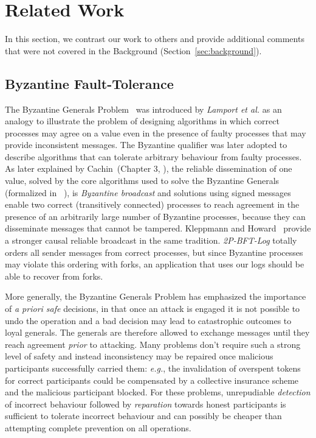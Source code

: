 \documentclass[9pt, oneside]{article}   	%
\begin{document}
\section{Related Work}
\label{sec:rel-work}

In this section, we contrast our work to others and provide additional comments that were not covered in the Background (Section~\ref{sec:background}).

\subsection{Byzantine Fault-Tolerance}

The Byzantine Generals Problem~\cite{lamport2019byzantinegenerals} was introduced by \textit{Lamport et al.} as an analogy to illustrate the problem of designing algorithms in which correct processes may agree on a value even in the presence of faulty processes that may provide inconsistent messages. The Byzantine qualifier was later adopted to describe algorithms that can tolerate arbitrary behaviour from faulty processes. As later explained by Cachin~(Chapter 3, \cite{lamport2019concurrency}), the reliable dissemination of one value, solved by the core algorithms used to solve the Byzantine Generals (formalized in ~\cite{pease1980pease}), is \textit{Byzantine broadcast} and solutions using signed messages enable two correct (transitively connected) processes to reach agreement in the presence of an arbitrarily large number of Byzantine processes, because they can disseminate messages that cannot be tampered. Kleppmann and Howard~\cite{kleppmann2020bec} provide a stronger causal reliable broadcast in the same tradition. \textit{2P-BFT-Log} totally orders all sender messages from correct processes, but since Byzantine processes may violate this ordering with forks, an application that uses our logs should be able to recover from forks.

More generally, the Byzantine Generals Problem has emphasized the importance of \textit{a priori safe} decisions, in that once an attack is engaged it is not possible to undo the operation and a bad decision may lead to catastrophic outcomes to loyal generals. The generals are therefore allowed to exchange messages until they reach agreement \textit{prior} to attacking. Many problems don't require such a strong level of safety and instead inconsistency may be repaired once malicious participants successfully carried them: \textit{e.g.}, the invalidation of overspent tokens~\cite{lavoie2023gocledger} for correct participants could be compensated by a collective insurance scheme and the malicious participant blocked. For these problems, unrepudiable \textit{detection} of incorrect behaviour followed by \textit{reparation} towards honest participants is sufficient to tolerate incorrect behaviour and can possibly be cheaper than attempting complete prevention on all operations.
\end{document}

